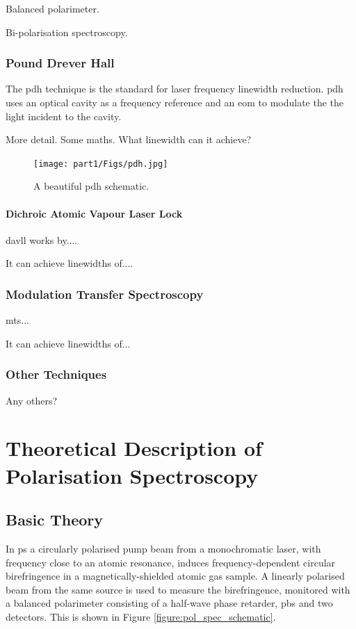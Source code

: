 Balanced polarimeter.\cite{pearman_polarization_2002,yoshikawa_frequency_2003}

Bi-polarisation spectroscopy.\cite{tiwari_laser_2006}


\subsection{Pound Drever Hall}

The \gls{pdh} technique is the standard for laser frequency linewidth reduction.\cite{drever_laser_1983}
\gls{pdh} uses an optical cavity as a frequency reference and an \gls{eom} to modulate the the light incident to the cavity.

More detail. Some maths. What linewidth can it achieve?\cite{ludlow_compact_2007}

\begin{figure}
\centering
\texttt{[image: part1/Figs/pdh.jpg]}
\caption{A beautiful \gls{pdh} schematic.}
\end{figure}
\subsubsection{Dichroic Atomic Vapour Laser Lock}
\Gls{davll} works by....

It can achieve linewidths of....

\subsection{Modulation Transfer Spectroscopy}
\Gls{mts}...

It can achieve linewidths of...\cite{negnevitsky_wideband_2013}

\subsection{Other Techniques}

Any others?

\chapter{Theoretical Description of Polarisation Spectroscopy}\label{section:pol_spec_theory}
\section{Basic Theory}

In \gls{ps} a circularly polarised pump beam from a monochromatic laser, with frequency close to an atomic resonance, induces frequency-dependent circular birefringence in a magnetically-shielded atomic gas sample.
A linearly polarised beam from the same source is used to measure the birefringence, monitored with a balanced polarimeter consisting of a half-wave phase retarder, \gls{pbs} and two detectors.
This is shown in Figure \ref{figure:pol_spec_schematic}.

